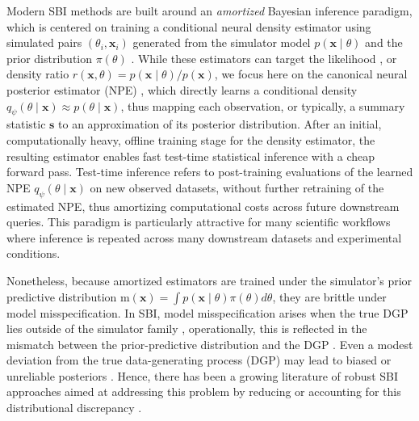 \documentclass{article}
\theoremstyle{plain}
\theoremstyle{definition}
\theoremstyle{remark}
\begin{document}
Modern SBI methods are built around an 
\emph{amortized} Bayesian inference paradigm, which is centered on training a conditional neural density estimator using simulated pairs $(\theta_i, \mathbf{x}_i)$ generated from the simulator model $p(\mathbf{x} \mid \theta)$ and the prior distribution $\pi(\theta)$ \citep{cranmerFrontierSimulationbasedInference2020a, deistler2025simulationbasedinferencepracticalguide}. While these estimators can target the likelihood \citep{papamakarios2019sequential}, or density ratio \citep{cranmer2015approximating, hermans2020likelihood} $r(\mathbf{x},\theta) = p(\mathbf{x} \mid \theta)/p(\mathbf{x})$, we focus here on the canonical neural posterior estimator (NPE) \citep{papamakariosFastEpsilonFree2016}, which directly learns a conditional density \( q_\psi(\theta \mid \mathbf{x}) \approx p(\theta \mid \mathbf{x})\), thus mapping each observation, or typically, a summary statistic \( \mathbf{s} \) to an approximation of its posterior distribution. After an initial, computationally heavy, offline training stage for the density estimator, the resulting estimator enables fast test-time statistical inference with a cheap forward pass. Test-time inference refers to post-training evaluations of the learned NPE $q_\psi(\theta \mid \mathbf{x})$ on new observed datasets, without further retraining of the estimated NPE, thus amortizing computational costs across future downstream queries. This paradigm is particularly attractive for many scientific workflows where inference is repeated across many downstream datasets and experimental conditions. 


Nonetheless, because amortized estimators are trained under the simulator's prior predictive distribution $\mathrm{m}(\mathbf{x}) = \int p(\mathbf{x} \mid \theta) \pi(\theta) d\theta$, they are brittle under model misspecification. In SBI, model misspecification arises when the true DGP lies outside of the simulator family \citep{cannonInvestigatingImpactModel2022a}, operationally, this is reflected in the mismatch between the prior-predictive distribution and the DGP \citep{schmittDetectingModelMisspecification2024a, elsemullerDoesUnsupervisedDomain2025c}. Even a modest deviation from the true data-generating process (DGP) may lead to biased or unreliable posteriors \citep{wardRobustNeuralPosterior2022a,schmittDetectingModelMisspecification2024a}. Hence, there has been a growing literature of robust SBI approaches aimed at addressing this problem by reducing or accounting for this distributional discrepancy \citep{elsemullerDoesUnsupervisedDomain2025c, kellySimulationbasedBayesianInference2025b}.
\end{document}
